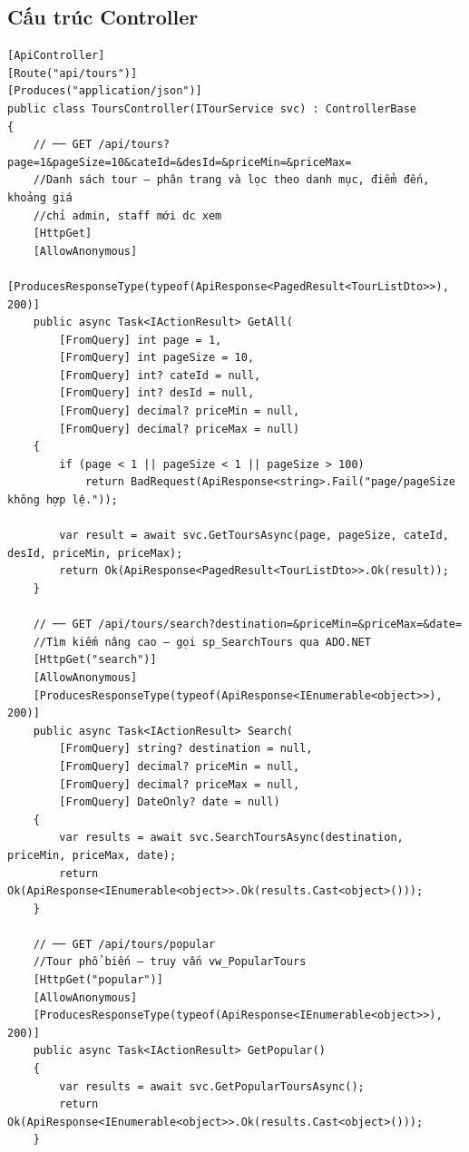 \subsection{Cấu trúc Controller}\label{sub4.1.2}


\begin{lstlisting}[style=csharp, caption={ToursController --- các action chính}]
[ApiController]
[Route("api/tours")]
[Produces("application/json")]
public class ToursController(ITourService svc) : ControllerBase
{
    // ── GET /api/tours?page=1&pageSize=10&cateId=&desId=&priceMin=&priceMax=
    //Danh sách tour — phân trang và lọc theo danh mục, điểm đến, khoảng giá
    //chỉ admin, staff mới dc xem
    [HttpGet]
    [AllowAnonymous]
    [ProducesResponseType(typeof(ApiResponse<PagedResult<TourListDto>>), 200)]
    public async Task<IActionResult> GetAll(
        [FromQuery] int page = 1,
        [FromQuery] int pageSize = 10,
        [FromQuery] int? cateId = null,
        [FromQuery] int? desId = null,
        [FromQuery] decimal? priceMin = null,
        [FromQuery] decimal? priceMax = null)
    {
        if (page < 1 || pageSize < 1 || pageSize > 100)
            return BadRequest(ApiResponse<string>.Fail("page/pageSize không hợp lệ."));

        var result = await svc.GetToursAsync(page, pageSize, cateId, desId, priceMin, priceMax);
        return Ok(ApiResponse<PagedResult<TourListDto>>.Ok(result));
    }

    // ── GET /api/tours/search?destination=&priceMin=&priceMax=&date=
    //Tìm kiếm nâng cao — gọi sp_SearchTours qua ADO.NET
    [HttpGet("search")]
    [AllowAnonymous]
    [ProducesResponseType(typeof(ApiResponse<IEnumerable<object>>), 200)]
    public async Task<IActionResult> Search(
        [FromQuery] string? destination = null,
        [FromQuery] decimal? priceMin = null,
        [FromQuery] decimal? priceMax = null,
        [FromQuery] DateOnly? date = null)
    {
        var results = await svc.SearchToursAsync(destination, priceMin, priceMax, date);
        return Ok(ApiResponse<IEnumerable<object>>.Ok(results.Cast<object>()));
    }

    // ── GET /api/tours/popular
    //Tour phổ biến — truy vấn vw_PopularTours
    [HttpGet("popular")]
    [AllowAnonymous]
    [ProducesResponseType(typeof(ApiResponse<IEnumerable<object>>), 200)]
    public async Task<IActionResult> GetPopular()
    {
        var results = await svc.GetPopularToursAsync();
        return Ok(ApiResponse<IEnumerable<object>>.Ok(results.Cast<object>()));
    }


\end{lstlisting}

